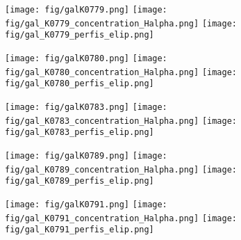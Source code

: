 \begin{figure}[!ht]
\begin{center}
\setcaptionmargin{1cm}
\texttt{[image: fig/galK0779.png]}
\texttt{[image: fig/gal\_K0779\_concentration\_Halpha.png]}
\texttt{[image: fig/gal\_K0779\_perfis\_elip.png]}
\end{center}
\end{figure}


\begin{figure}[!ht]
\begin{center}
\setcaptionmargin{1cm}
\texttt{[image: fig/galK0780.png]}
\texttt{[image: fig/gal\_K0780\_concentration\_Halpha.png]}
\texttt{[image: fig/gal\_K0780\_perfis\_elip.png]}
\end{center}
\end{figure}


\begin{figure}[!ht]
\begin{center}
\setcaptionmargin{1cm}
\texttt{[image: fig/galK0783.png]}
\texttt{[image: fig/gal\_K0783\_concentration\_Halpha.png]}
\texttt{[image: fig/gal\_K0783\_perfis\_elip.png]}
\end{center}
\end{figure}


\begin{figure}[!ht]
\begin{center}
\setcaptionmargin{1cm}
\texttt{[image: fig/galK0789.png]}
\texttt{[image: fig/gal\_K0789\_concentration\_Halpha.png]}
\texttt{[image: fig/gal\_K0789\_perfis\_elip.png]}
\end{center}
\end{figure}


\begin{figure}[!ht]
\begin{center}
\setcaptionmargin{1cm}
\texttt{[image: fig/galK0791.png]}
\texttt{[image: fig/gal\_K0791\_concentration\_Halpha.png]}
\texttt{[image: fig/gal\_K0791\_perfis\_elip.png]}
\end{center}
\end{figure}


